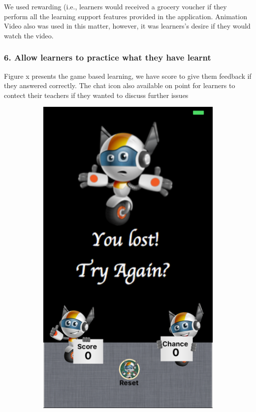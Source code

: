 We used rewarding (i.e., learners would received a grocery voucher if they perform all the learning support features provided in the application. Animation Video also was used in this matter, however, it was learners's desire if they would watch the video. 

\subsubsection{6. Allow learners to practice what they have learnt} 
Figure x presents the game based learning, we have score to give them feedback if they answered correctly. The chat icon also available on point for learners to contect their teachers if they wanted to discuss further issues

\begin{figure}[!hbt]\centering
    \begin{subfigure}{0.35\textwidth}
\includegraphics[width=\textwidth]{feed1}

\end{subfigure}
\end{figure}
